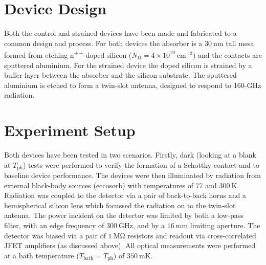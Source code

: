 \documentclass[final]{svjour2}
\begin{document}
\section{Device Design}
Both the control and strained devices have been made and fabricated to a common design and process. For both devices the absorber is a $30~\mathrm{nm}$ tall mesa formed from etching n\textsuperscript{++}-doped silicon ($N_{\mathrm{D}} = 4 \times 10^{19}~\mathrm{cm^{-3}}$) and the contacts are sputtered aluminium. For the strained device the doped silicon is strained by a  buffer layer between the absorber and the silicon substrate. The sputtered aluminium is etched to form a twin-slot antenna, designed to respond to 160-GHz radiation.
%
\section{Experiment Setup}
Both devices have been tested in two scenarios. Firstly, dark (looking at a blank at $T_{\mathrm{ph}}$) tests were performed to verify the formation of a Schottky contact and to baseline device performance. The devices were then illuminated by radiation from external black-body sources (eccosorb) with temperatures of $77$ and $300~\mathrm{K}$. Radiation was coupled to the detector via a pair of back-to-back horns and a hemispherical silicon lens which focussed the radiation on to the twin-slot antenna. The power incident on the detector was limited by both a low-pass filter, with an edge frequency of $300~\mathrm{GHz}$, and by a $16~\mathrm{mm}$ limiting aperture. The detector was biased via a pair of $1~\mathrm{M\Omega}$ resistors and readout via cross-correlated JFET amplifiers (as discussed above). All optical measurements were performed at a bath temperature ($T_{\mathrm{bath}} = T_{\mathrm{ph}}$) of $350~\mathrm{mK}$. %
%
\end{document}
